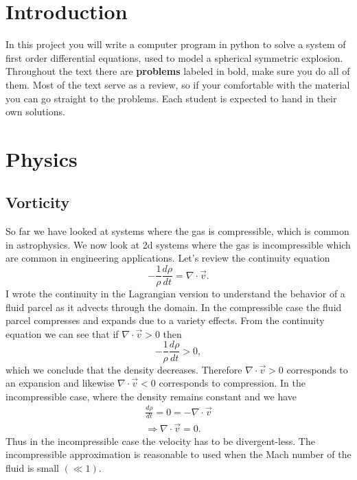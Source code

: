 \documentclass{article}
\begin{document}

\section{Introduction}
In this project you will write a computer program in python to solve a system of first order differential equations, used to model a spherical symmetric explosion. Throughout the text there are \textbf{problems} labeled in bold, make sure you do all of them. Most of the text serve as  a review, so if your comfortable with the material you can go straight to the problems. Each student is expected to hand in their own solutions.

\section{Physics}
\subsection{Vorticity}
So far we have looked at systems where the gas is compressible, which is common in astrophysics. We now look at 2d systems where the gas is incompressible which are common in engineering applications. Let's review the continuity equation
\begin{equation*}
-\frac{1}{\rho}\frac{d\rho}{dt} = \nabla\cdot\vec{v}.
\end{equation*}
I wrote the continuity in the Lagrangian version to understand the behavior of a fluid parcel as it advects through the domain. In the compressible case the fluid parcel compresses and expands due to a variety effects. From the continuity equation we can see that if $\nabla\cdot\vec{v}>0$ then
\begin{equation*}
-\frac{1}{\rho}\frac{d\rho}{dt} > 0,
\end{equation*}
which we conclude that the density decreases. Therefore $\nabla\cdot\vec{v} > 0$ corresponds to an expansion and likewise $\nabla\cdot\vec{v} < 0$ corresponds to compression. In the incompressible case, where the density remains constant and we have
\begin{gather*}
\frac{d\rho}{dt} = 0 = -\nabla\cdot\vec{v}\\
\Rightarrow \nabla\cdot\vec{v} = 0.
\end{gather*}
Thus in the incompressible case the velocity has to be divergent-less. The incompressible approximation is reasonable to used when the Mach number of the fluid is small $(\ll 1)$.
\end{document}
